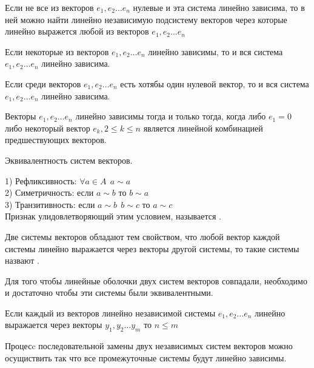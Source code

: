 \begin{theorem}
  Если не все из векторов $e_1, e_2 \ldots e_n$ нулевые и эта система линейно
зависима, то в ней можно найти линейно независимую подсистему векторов через
которые линейно выражется любой из векторов $e_1, e_2 \ldots e_n$
\end{theorem}

\begin{theorem}
  Если некоторые из векторов $e_1, e_2 \ldots e_n$ линейно зависимы, то и вся
система $e_1, e_2 \ldots e_n$ линейно зависима.
\end{theorem}

\begin{theorem}
  Если среди векторов $e_1, e_2 \ldots e_n$ есть хотябы один нулевой вектор,
то и вся система $e_1, e_2 \ldots e_n$ линейно зависима.
\end{theorem}

\begin{theorem}
  Векторы $e_1, e_2 \ldots e_n$ линейно зависимы тогда и только тогда, когда
либо $e_1 = 0$ либо некоторый вектор $e_k, 2 \le k \le n$ является линейной
комбинацией предшествующих векторов.
\end{theorem}

\begin{title}[\Large]
  Эквивалентность систем векторов.
\end{title}

\begin{defin}
  1) Рефликсивность: $\forall a \in A ~~ a \sim a$\\
  2) Симетричность: если $a \sim b$ то $b \sim a$\\
  3) Транзитивность: если $a \sim b ~~ b \sim c$ то $a \sim c$\\
Признак улидовлетворяющий этим условием, называется
.
\end{defin}

\begin{defin}
  Две системы векторов обладают тем свойством, что любой вектор каждой системы
линейно выражается через векторы другой системы, то такие системы назвают
.
\end{defin}

\begin{theorem}
  Для того чтобы линейные оболочки двух систем векторов совпадали, необходимо и
достаточно чтобы эти системы были эквивалентными.
\end{theorem}

\begin{theorem}
  Если каждый из векторов линейно независимой системы $e_1, e_2 \ldots e_n$
линейно выражается через векторы $y_1, y_2 \ldots y_m$ то $n \le m$
\end{theorem}

\begin{theorem}
  Процесc последовательной замены двух независимых систем векторов можно
осущиствить так что все промежуточные системы будут линейно зависимы.
\end{theorem}